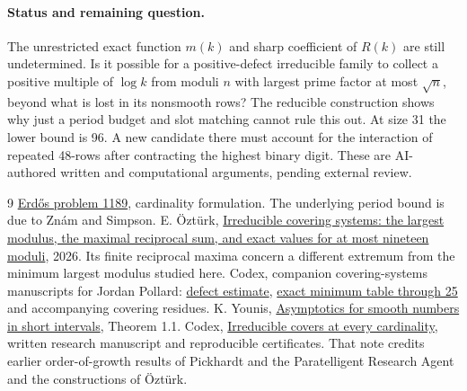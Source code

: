\documentclass[10pt]{article}
\begin{document}
\paragraph{Status and remaining question.} The unrestricted exact function $m(k)$ and sharp coefficient of $R(k)$ are still undetermined. Is it possible for a positive-defect irreducible family to collect a positive multiple of $\log k$ from moduli $n$ with largest prime factor at most $\sqrt n$, beyond what is lost in its nonsmooth rows? The reducible construction shows why just a period budget and slot matching cannot rule this out. At size 31 the lower bound is 96. A new candidate there must account for the interaction of repeated 48-rows after contracting the highest binary digit. These are AI-authored written and computational arguments, pending external review.
\begin{thebibliography}{9}
 \href{https://www.erdosproblems.com/1189}{Erd\H os problem 1189}, cardinality formulation. The underlying period bound is due to Zn\'am and Simpson.
 E. \"Ozt\"urk, \href{https://doi.org/10.13140/RG.2.2.16138.63684}{Irreducible covering systems: the largest modulus, the maximal reciprocal sum, and exact values for at most nineteen moduli}, 2026. Its finite reciprocal maxima concern a different extremum from the minimum largest modulus studied here.
 Codex, companion covering-systems manuscripts for Jordan Pollard: \href{https://github.com/jpollard-cs/open-math-agents/blob/b32f70d5e6f1337e10ad264b55ea8489c7ed7773/research/proof-manuscripts/covering-systems/reciprocal-sums/defect-tradeoff.md}{defect estimate}, \href{https://github.com/jpollard-cs/open-math-agents/blob/6d05185cfb18d26dd67a443067d6559b017e4657/research/proof-manuscripts/covering-systems/reciprocal-sums/finite-60.md}{exact minimum table through 25} and accompanying covering residues.
 K. Younis, \href{https://arxiv.org/abs/2409.05761}{Asymptotics for smooth numbers in short intervals}, Theorem 1.1.
 Codex, \href{https://github.com/jpollard-cs/open-math-agents/tree/d0e21ac225a5ca3f274071fbe9751cdc54a479f3/research/proof-manuscripts/covering-systems/reciprocal-sums}{Irreducible covers at every cardinality}, written research manuscript and reproducible certificates. That note credits earlier order-of-growth results of Pickhardt and the Paratelligent Research Agent and the constructions of \"Ozt\"urk.
\end{thebibliography}
\end{document}
